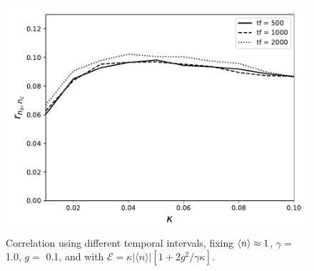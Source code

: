 \documentclass[%
 reprint,
 amsmath,amssymb,
 aps, 
]{revtex4-1}
\begin{document}
\begin{center}
\begin{figure}[h!]
\begin{center}
\includegraphics[scale = 0.5]{million2.pdf}
\caption{\small{Correlation using different temporal intervals, fixing $\expval{n} \approx 1$, $\gamma =$ 1.0, $g =$ 0.1, and with  $\mathcal{E} =  \kappa |\langle n \rangle|[1 + 2g^2/\gamma \kappa]$.}}  \label{errorzz}
\end{center}
\end{figure}
\end{center}

\end{document}
